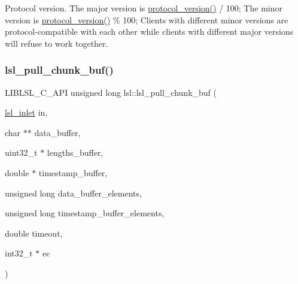 Protocol version. The major version is \hyperlink{namespacelsl_a59009e83a8f0e33643474b373ad2f7f2}{protocol\+\_\+version()} / 100; The minor version is \hyperlink{namespacelsl_a59009e83a8f0e33643474b373ad2f7f2}{protocol\+\_\+version()} \% 100; Clients with different minor versions are protocol-\/compatible with each other while clients with different major versions will refuse to work together. \mbox{\label{namespacelsl_a90d24057f9ba37f33d3539666af27082}} 
\subsubsection{\texorpdfstring{lsl\+\_\+pull\+\_\+chunk\+\_\+buf()}{lsl\_pull\_chunk\_buf()}}
{\footnotesize\ttfamily L\+I\+B\+L\+S\+L\+\_\+\+C\+\_\+\+A\+PI unsigned long lsl\+::lsl\+\_\+pull\+\_\+chunk\+\_\+buf (\begin{DoxyParamCaption}\item[{\hyperlink{namespacelsl_a884a3363cfcba75d7ce8f00c1c4c54f1}{lsl\+\_\+inlet}}]{in,  }\item[{char $\ast$$\ast$}]{data\+\_\+buffer,  }\item[{uint32\+\_\+t $\ast$}]{lengths\+\_\+buffer,  }\item[{double $\ast$}]{timestamp\+\_\+buffer,  }\item[{unsigned long}]{data\+\_\+buffer\+\_\+elements,  }\item[{unsigned long}]{timestamp\+\_\+buffer\+\_\+elements,  }\item[{double}]{timeout,  }\item[{int32\+\_\+t $\ast$}]{ec }\end{DoxyParamCaption})}

